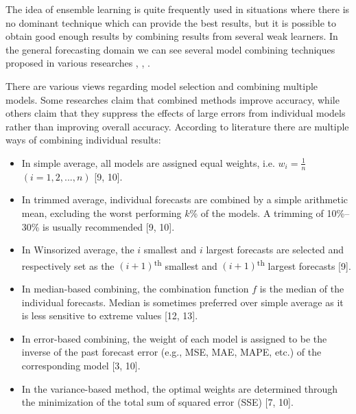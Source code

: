The idea of ensemble learning is quite frequently used in situations where there is no dominant technique which can provide the best results, but it is possible to obtain good enough results by combining results from several weak learners. In the general forecasting domain we can see several model combining techniques proposed in various researches \cite{Zou_2004}, \cite{Wagner_2011},
\cite{Zhang_2003}.  

There are various views regarding model selection and combining multiple models. Some researches claim that combined methods improve accuracy, while others claim that they suppress the effects of large errors from individual models rather than improving overall accuracy. According to literature there are multiple ways of combining individual results\cite{Adhikari_2012}:
\begin{itemize}
\item In simple average, all models are assigned equal weights, i.e. $w_{i}=\frac{1}{n}$ $(i=1, 2,..., n)$ [9, 10].
\item In trimmed average, individual forecasts are combined by a simple arithmetic mean, excluding the worst performing $k$\% of the models. A trimming of 10\%–30\% is usually recommended [9, 10].
\item In Winsorized average, the $i$ smallest and $i$ largest forecasts are selected and respectively set as the $(i+1)$\textsuperscript{th} smallest and $(i+1)$\textsuperscript{th} largest forecasts [9].
\item In median-based combining, the combination function $f$ is the median of the individual forecasts. Median is sometimes preferred over simple average as it is less sensitive to extreme values [12, 13].
\item In error-based combining, the weight of each model is assigned to be the inverse of the past forecast error (e.g., MSE, MAE, MAPE, etc.) of the corresponding model [3, 10].
\item In the variance-based method, the optimal weights are determined through the minimization of the total sum of squared error (SSE) [7, 10].
\end{itemize}